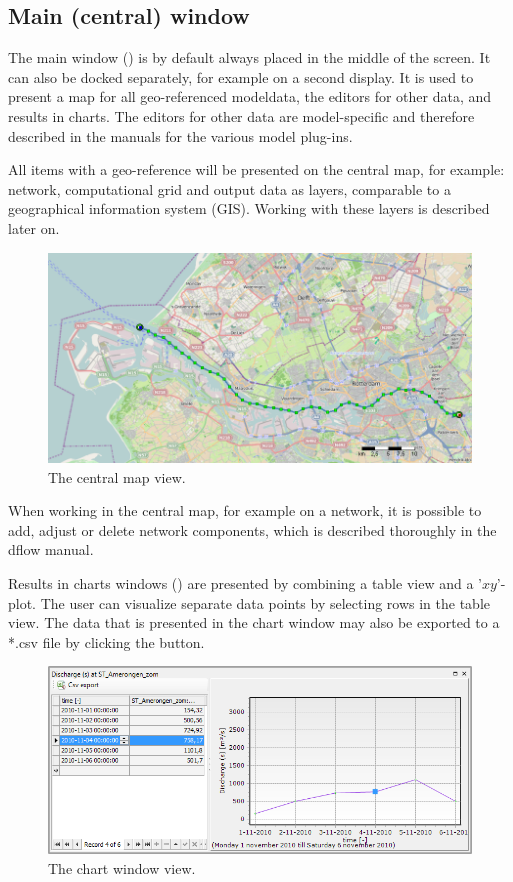 \subsection{Main (central) window}
\label{subsec:Main}
The main window () is by default always placed in the middle of the screen. It can also be docked separately, for example on a second display. It is used to present a map for all geo-referenced modeldata, the editors for other data, and results in charts. The editors for other data are model-specific and therefore described in the manuals for the various model plug-ins.

All items with a geo-reference will be presented on the central map, for example: network, computational grid and output data as layers, comparable to a geographical information system (GIS). Working with these layers is described later on.
%
\begin{figure} [H]
	\centering
		\includegraphics[width=\textwidth]{figures/chapter_overview/example_map.png}
	\caption{The central map view.}
	\label{fig:fig2.3}
\end{figure}
When working in the central map, for example on a network, it is possible to add, adjust or delete network components, which is described thoroughly in the dflow manual.

Results in charts windows () are presented by combining a table view and a '$xy$'-plot. The user can visualize separate data points by selecting rows in the table view. The data that is presented in the chart window may also be exported to a *.csv file by clicking the  button.
%
\begin{figure} [H]
	\centering
		\includegraphics[width=\textwidth]{figures/chapter_overview/example_chart_window.png}
	\caption{The chart window view.}
	\label{fig:chartwindow}
\end{figure}

